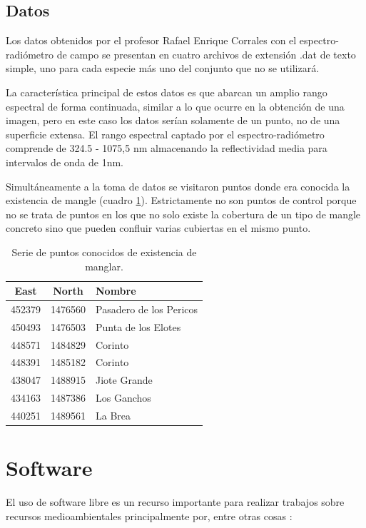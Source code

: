 \subsection{Datos}\label{subsec:datos}
Los datos obtenidos por el profesor Rafael Enrique Corrales con el espectro-radiómetro de campo se presentan en cuatro archivos de extensión .dat de texto simple, uno para cada especie más uno del conjunto que no se utilizará.\Sep

La característica principal de estos datos es que abarcan un amplio rango espectral de forma continuada, similar a lo que ocurre en la obtención de una imagen, pero en este caso los datos serían solamente de un punto, no de una superficie extensa. El rango espectral captado por el espectro-radiómetro comprende de 324.5 - 1075,5 nm almacenando la reflectividad media para intervalos de onda de 1nm.\Sep

Simultáneamente a la toma de datos se visitaron puntos donde era conocida la existencia de mangle (cuadro \ref{tab:puntos}). Estrictamente no son puntos de control porque no se trata de puntos en los que no solo existe la cobertura de un tipo de mangle concreto sino que pueden confluir varias cubiertas en el mismo punto.

\begin{table}
	\centering
	\caption[Puntos de control]{Serie de puntos conocidos de existencia de manglar.}
	\begin{tabular}{@{}ccl@{}}
	\toprule[0.4mm]
	East & North & Nombre\\
	\midrule
	452379 & 1476560 & Pasadero de los Pericos\\
	450493 & 1476503 & Punta de los Elotes\\
	448571 & 1484829 & Corinto\\
	448391 & 1485182 & Corinto\\
	438047 & 1488915 & Jiote Grande\\
	434163 & 1487386 & Los Ganchos\\
	440251 & 1489561 & La Brea\\
	\bottomrule[0.4mm]
	\end{tabular}
	\label{tab:puntos}
\end{table}

\section{Software} \label{sec:software}
El uso de software libre es un recurso importante para realizar trabajos sobre recursos medioambientales principalmente por, entre otras cosas \citep{MatellanOliveira2004}:

